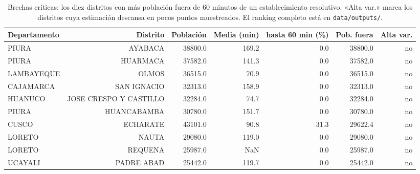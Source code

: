 \begin{table}[htbp]
\caption{Brechas críticas: los diez distritos con más población fuera de 60 minutos de un establecimiento resolutivo. «Alta var.» marca los distritos cuya estimación descansa en pocos puntos muestreados. El ranking completo está en \texttt{data/outputs/}.}
\label{tab:peores-distritos}
\footnotesize
\begin{tabular}{lrrrrrr}
\toprule
Departamento & Distrito & Población & Media (min) & hasta 60 min (\%) & Pob. fuera & Alta var. \\
\midrule
PIURA & AYABACA & 38800.0 & 169.2 & 0.0 & 38800.0 & no \\
PIURA & HUARMACA & 37582.0 & 141.3 & 0.0 & 37582.0 & no \\
LAMBAYEQUE & OLMOS & 36515.0 & 70.9 & 0.0 & 36515.0 & no \\
CAJAMARCA & SAN IGNACIO & 32313.0 & 158.9 & 0.0 & 32313.0 & no \\
HUANUCO & JOSE CRESPO Y CASTILLO & 32284.0 & 74.7 & 0.0 & 32284.0 & no \\
PIURA & HUANCABAMBA & 30780.0 & 151.7 & 0.0 & 30780.0 & no \\
CUSCO & ECHARATE & 43101.0 & 90.8 & 31.3 & 29622.4 & no \\
LORETO & NAUTA & 29080.0 & 119.0 & 0.0 & 29080.0 & no \\
LORETO & REQUENA & 25987.0 & NaN & 0.0 & 25987.0 & no \\
UCAYALI & PADRE ABAD & 25442.0 & 119.7 & 0.0 & 25442.0 & no \\
\bottomrule
\end{tabular}
\end{table}

